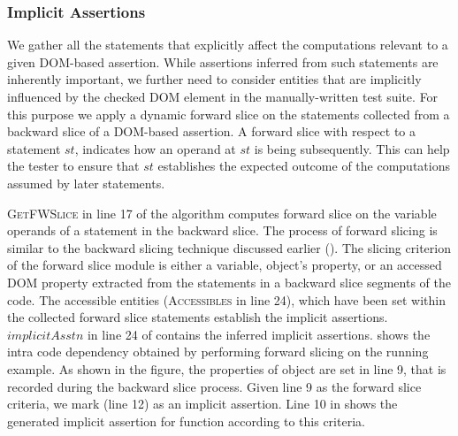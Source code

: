 \subsubsection{Implicit Assertions} \label{Sec:implicitAssertions}
We gather all the statements that explicitly affect the computations relevant to a given DOM-based assertion. While assertions inferred from such statements are inherently important, we further need to consider entities that are implicitly influenced by the checked DOM element in the manually-written test suite. For this purpose we apply a dynamic forward slice on the statements collected from a backward slice of a DOM-based assertion.
A forward slice with respect to a statement $st$,
indicates how  an operand at $st$ is being subsequently. 
This can help the tester to ensure that $st$ establishes the expected outcome of the computations assumed by later statements. 


\textsc{GetFWSlice} in line 17 of the algorithm computes forward slice on the variable operands of a statement in the backward slice.
The process of forward slicing is similar to the backward slicing technique discussed earlier (). The slicing criterion of the forward slice module is either a variable, object's property, or an accessed DOM property extracted from the statements in a backward slice segments of the code. The accessible entities (\textsc{Accessibles} in line 24), which have been set within the collected forward slice statements establish the implicit assertions.
$implicitAsstn$ in line 24 of  contains the inferred implicit assertions.
 shows the intra code dependency obtained by performing forward slicing on the running example. 
As shown in the figure, the properties of object  are set in line 9, that is recorded during the backward slice process. Given line 9 as the forward slice criteria, we mark  (line 12) as an implicit assertion.
Line 10 in  shows the generated implicit assertion for  function according to this criteria.        